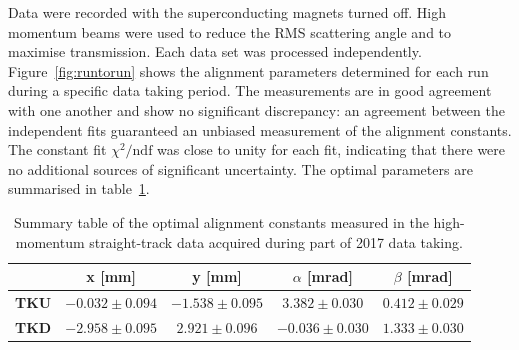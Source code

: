 Data were recorded with the superconducting magnets turned off.
High momentum beams were used to reduce the RMS scattering angle and
to maximise transmission.   
Each data set was processed independently.
Figure~\ref{fig:runtorun} shows the alignment parameters determined for
each run during a specific data taking period.
The measurements are in good agreement with one another and show no
significant discrepancy: an agreement between the independent fits
guaranteed an unbiased measurement of the alignment constants.
The constant fit $\chi^2/\text{ndf}$ was close to unity for each fit,
indicating that there were no additional sources of significant
uncertainty.
The optimal parameters are summarised in
table~\ref{tab:201701_constants}. 
\begin{table}
  \begin{center}
    \begin{tabular}{l|c|c|c|c}
	& \textbf{x [mm]} & \textbf{y [mm]} & \textbf{$\alpha$ [mrad]} & \textbf{$\beta$ [mrad]} \\
	\hline
	\textbf{TKU} & $-0.032\pm0.094$ & $-1.538\pm0.095$ & $ 3.382\pm0.030$ & $0.412\pm0.029$ \\
	\textbf{TKD} & $-2.958\pm0.095$ & $ 2.921\pm0.096$ & $-0.036\pm0.030$ & $1.333\pm0.030$
    \end{tabular}
  \end{center}
  \caption{
    Summary table of the optimal alignment constants measured in the
    high-momentum straight-track data acquired during part of 2017
    data taking.
  }
  \label{tab:201701_constants}
\end{table}
